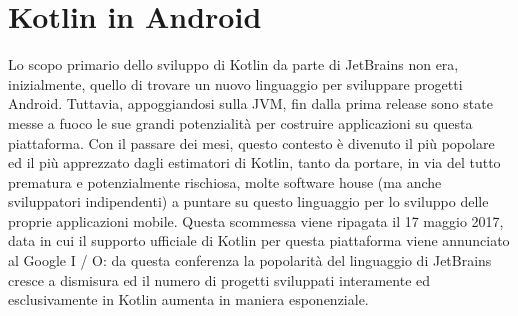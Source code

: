 
\chapter{Kotlin in Android}
Lo scopo primario dello sviluppo di Kotlin da parte di JetBrains non era, inizialmente, quello di trovare un nuovo linguaggio per sviluppare progetti Android. Tuttavia, appoggiandosi sulla JVM, fin dalla prima release sono state messe a fuoco le sue grandi potenzialità per costruire applicazioni su questa piattaforma. Con il passare dei mesi, questo contesto è divenuto il più popolare ed il più apprezzato dagli estimatori di Kotlin, tanto da portare, in via del tutto prematura e potenzialmente rischiosa, molte software house (ma anche sviluppatori indipendenti) a puntare su questo linguaggio per lo sviluppo delle proprie applicazioni mobile. Questa scommessa viene ripagata il 17 maggio 2017, data in cui il supporto ufficiale di Kotlin per questa piattaforma viene annunciato al Google I / O: da questa conferenza la popolarità del linguaggio di JetBrains cresce a dismisura ed il numero di progetti sviluppati interamente ed esclusivamente in Kotlin aumenta in maniera esponenziale.\\

